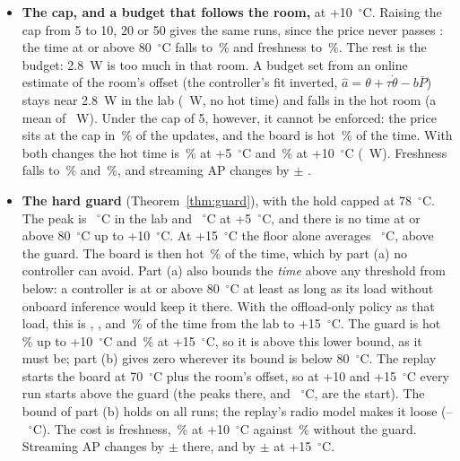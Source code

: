 \documentclass[conference]{IEEEtran}
\begin{document}
\begin{itemize}
\TsAmbFiveCorrHot\,\% and \TsAmbTenCorrHot\,\%. The capped hold does not help either at +10~$^\circ$C
(\TsHoldSeventyEightAmbTenHot\,\%). There the price is at its cap in \TsHoldSeventyEightAmbTenCapPct\,\% of the
updates, and the cap term reaches \TsHoldSeventyEightAmbTenCapW~W: the cap is the remaining lever.
\item \textbf{The cap, and a budget that follows the room,} at +10~$^\circ$C. Raising the cap from 5 to 10, 20 or 50
gives the same runs, since the price never passes \TsCapTenMuMax: the time at or above 80~$^\circ$C falls to
\TsCapTenHot\,\% and freshness to \TsCapTenFresh\,\%. The rest is the budget: 2.8~W is too much in that room. A budget
set from an online estimate of the room's offset (the controller's fit inverted, $\hat a = \theta + \tau\dot\theta - b\bar P$)
stays near 2.8~W in the lab (\TsAdaptLabBudget~W, no hot time) and falls in the hot room (a mean of \TsAdaptTenBudget~W).
Under the cap of 5, however, it cannot be enforced: the price sits at the cap in \TsAdaptTenCapPct\,\% of the updates,
and the board is hot \TsAdaptTenHot\,\% of the time. With both changes the hot time is \TsAdaptCapFiveHot\,\% at
+5~$^\circ$C and \TsAdaptCapTenHot\,\% at +10~$^\circ$C (\TsAdaptCapTenPower~W). Freshness falls to
\TsAdaptCapFiveFresh\,\% and \TsAdaptCapTenFresh\,\%, and streaming AP changes by \TsAdaptCapTenSap{} $\pm$
\TsAdaptCapTenSapCi.
\item \textbf{The hard guard} (Theorem~\ref{thm:guard}), with the hold capped at 78~$^\circ$C. The peak is
\TgRpLabMax~$^\circ$C in the lab and \TgRpFiveMax~$^\circ$C at +5~$^\circ$C, and there is no time at or above
80~$^\circ$C up to +10~$^\circ$C. At +15~$^\circ$C the floor alone averages \TgRpFifteenFloor~$^\circ$C, above the
guard. The board is then hot \TsGuardFifteenHot\,\% of the time, which by part (a) no controller can avoid. Part (a)
also bounds the \emph{time} above any threshold from below: a controller is at or above 80~$^\circ$C at least as long
as its load without onboard inference would keep it there. With the offload-only policy as that load, this is
\TgRpLabFloorHot, \TgRpFiveFloorHot, \TgRpTenFloorHot{} and \TgRpFifteenFloorHot\,\% of the time from the lab to
+15~$^\circ$C. The guard is hot \TsGuardTenHot\,\% up to +10~$^\circ$C and \TsGuardFifteenHot\,\% at +15~$^\circ$C, so it is
above this lower bound, as it must be; part (b) gives zero wherever its bound is below 80~$^\circ$C. The replay
starts the board at 70~$^\circ$C plus the room's offset, so at +10 and +15~$^\circ$C every run starts above the guard
(the peaks there, \TgRpTenMax{} and \TgRpFifteenMax~$^\circ$C, are the start). The bound of part (b) holds on all
\TgReplayRuns{} runs; the replay's radio model makes it loose (\TgRpLabBound--\TgRpFifteenBound~$^\circ$C). The cost
is freshness, \TsGuardTenFresh\,\% at +10~$^\circ$C against \TsHoldSeventyEightAmbTenFresh\,\% without the guard. Streaming
AP changes by \TsGuardTenSap{} $\pm$ \TsGuardTenSapCi{} there, and by \TsGuardFifteenSap{} $\pm$ \TsGuardFifteenSapCi{}
at +15~$^\circ$C.
\end{itemize}
\end{document}
